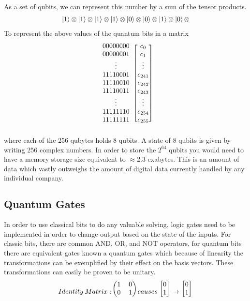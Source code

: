 \documentclass[12pt]{article}
\begin{document}
As a set of qubits, we can represent this number by a sum of the tensor products. 
$$ \ket{1}\otimes\ket{1}\otimes\ket{1}\otimes\ket{1}\otimes\ket{0}\otimes\ket{0}\otimes\ket{1}\otimes\ket{0}\otimes $$
To represent the above values of the quantum bits in a matrix 
$$ 
\begin{blockarray}{cc}
\begin{block}{c[c]}
00000000 & c_0 \\
00000001 & c_1 \\
\vdots & \vdots \\
11110001 & c_{241} \\
11110010 & c_{242} \\ 
11110011 & c_{243} \\ 
\vdots & \vdots \\
11111110 & c_{254} \\
11111111 & c_{255} \\
\end{block}
\end{blockarray}
$$
where each of the 256 qubytes holds 8 qubits. A state of 8 qubits is given by writing 256 complex numbers. In order to store the $2^{64}$ qubits you would need to have a memory storage size equivalent to $\approx 2.3$ exabytes. This is an amount of data which vastly outweighs the amount of digital data currently handled by any individual company. \cite{storage}
\subsection{Quantum Gates}
In order to use classical bits to do any valuable solving, logic gates need to be implemented in order to change output based on the state of the inputs. For classic bits, there are common AND, OR, and NOT operators, for quantum bits there are equivalent gates known a quantum gates which because of linearity the transformations can be exemplified by their effect on the basis vectors. These transformations can easily be proven to be unitary.
$$
Identity\:Matrix: 
\begin{blockarray}{cc}
\begin{block}{(cc)}
1 & 0\\
0 & 1\\
\end{block}
\end{blockarray}
 \:causes\:
\begin{blockarray}{c}
\begin{block}{[c]}
0\\
1\\
\end{block}
\end{blockarray}
\rightarrow
\begin{blockarray}{c}
\begin{block}{[c]}
0\\
1\\
\end{block}
\end{blockarray}
\\
$$
\end{document}
